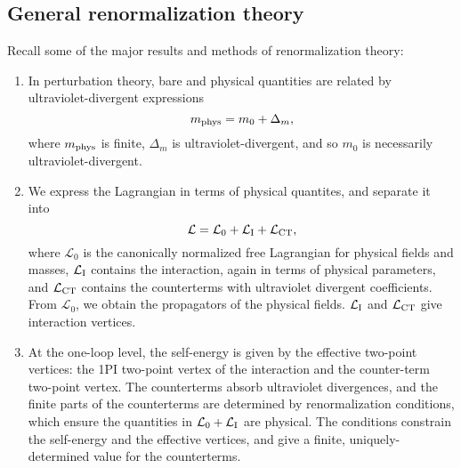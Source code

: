 \subsection{General renormalization theory}
Recall some of the major results and methods of renormalization theory:
\begin{enumerate}
\item In perturbation theory, bare and physical quantities are related by ultraviolet-divergent expressions
\[m_{\rm phys} = m_0 + \Delta_m,\]
where $m_{\rm phys}$ is finite, $\Delta_m$ is ultraviolet-divergent, and so $m_0$ is necessarily ultraviolet-divergent.
\item We express the Lagrangian in terms of physical quantites, and separate it into
\[\mathcal{L} = \mathcal{L}_0 + \mathcal{L}_{\rm I} + \mathcal{L}_{\rm CT},\]
where $\mathcal{L}_0$ is the canonically normalized free Lagrangian for physical fields and masses, $\mathcal{L}_{\rm I}$ contains the interaction, again in terms of physical parameters, and $\mathcal{L}_{\rm CT}$ contains the counterterms with ultraviolet divergent coefficients. From $\mathcal{L}_0$, we obtain the propagators of the physical fields. $\mathcal{L}_{\rm I}$ and $\mathcal{L}_{\rm CT}$ give
interaction vertices.
\item At the one-loop level, the self-energy is given by the effective two-point vertices: the 1PI two-point vertex of the interaction and the counter-term two-point vertex. The counterterms absorb ultraviolet divergences, and the finite parts of the counterterms are determined by renormalization conditions,
which ensure the quantities in $\mathcal{L}_0 + \mathcal{L}_{\rm I}$ are physical. The conditions constrain the self-energy and the effective vertices, and give a finite, uniquely-determined value for the counterterms.
\end{enumerate}
